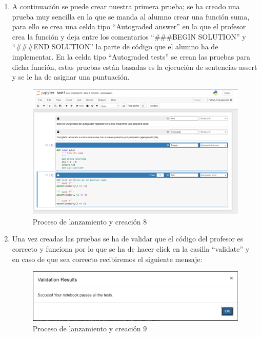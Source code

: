 \begin{enumerate}
\item A continuación se puede crear nuestra primera prueba; se ha creado una prueba muy sencilla en la que se manda al alumno crear una función suma, para ello se crea una celda tipo “Autograded answer” en la que el profesor crea la función y deja entre los comentarios “\#\#\#BEGIN SOLUTION” y “\#\#\#END SOLUTION” la parte de código que el alumno ha de implementar. En la celda tipo “Autograded tests” se crean las pruebas para dicha función, estas pruebas están basadas es la ejecución de sentencias assert y se le ha de asignar una puntuación.

\begin{figure}[H]
    \centering
    \includegraphics[width=1\textwidth]{img/prueba/prueba_8.png}
    \caption{Proceso de lanzamiento y creación 8}
\end{figure}

\item Una vez creadas las pruebas se ha de validar que el código del profesor es correcto y funciona por lo que se ha de hacer click en la casilla “validate” y en caso de que sea correcto recibiremos el siguiente mensaje:

\begin{figure}[H]
    \centering
    \includegraphics[width=1\textwidth]{img/prueba/prueba_9.png}
    \caption{Proceso de lanzamiento y creación 9}
\end{figure}


\end{enumerate}
